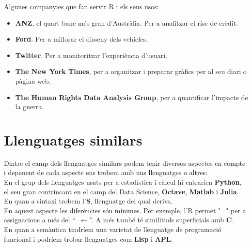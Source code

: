 \documentclass[12pt]{article}
\begin{document}
Algunes companyies que fan servir R i els seus usos:
\begin{itemize}
\item \textbf{ANZ}, el quart banc més gran d'Austràlia. Per a analitzar el risc de crèdit.
\item \textbf{Ford}. Per a millorar el disseny dels vehicles.
\item \textbf{Twitter}. Per a monitoritzar l'experiència d'usuari.
\item  \textbf{The New York Times}, per a organitzar i preparar gràfics per al seu diari o pàgina web.
\item \textbf{The Human Rights Data Analysis Group}, per a quantificar l'impacte de la guerra.
\end{itemize}

\section{Llenguatges similars}

Dintre el camp dels llenguatges similars podem tenir diversos aspectes en compte i depenent de cada aspecte ens trobem amb uns llenguatges o altres:\\ 

En el grup dels llenguatges usats per a estadística i càlcul hi entrarien \textbf{Python}, el seu gran contrincant en el camp del Data Science, \textbf{Octave}, \textbf{Matlab} i \textbf{Julia}. 
En quan a sintaxi trobem l'\textbf{S}, llenguatge del qual deriva.
\\ 

En aquest aspecte les diferències són mínimes. Per exemple, l'R permet "=" per a assignacions a més del “~$\leftarrow$”. A més també té similituds superficials amb \textbf{C}.
 \\  
 
En quan a semàntica tindríem una varietat de llenguatge de programació funcional i podríem trobar llenguatges com \textbf{Lisp} i \textbf{APL}. 
\end{document}
